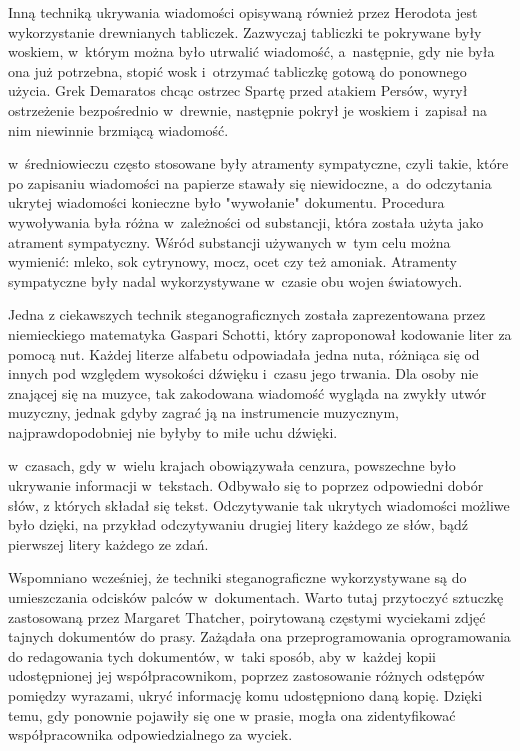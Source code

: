 \documentclass[a4paper, twoside, 12pt]{report}
\begin{document}
        Inną techniką ukrywania wiadomości opisywaną również przez Herodota
        jest wykorzystanie drewnianych tabliczek. Zazwyczaj tabliczki te pokrywane
        były woskiem, w~którym można było utrwalić wiadomość, a~następnie, gdy
        nie była ona już potrzebna, stopić wosk i~otrzymać tabliczkę gotową do
        ponownego użycia. Grek Demaratos chcąc ostrzec Spartę przed atakiem Persów,
        wyrył ostrzeżenie bezpośrednio w~drewnie, następnie pokrył je woskiem
        i~zapisał na nim niewinnie brzmiącą wiadomość.

        w~średniowieczu często stosowane były atramenty sympatyczne, czyli takie,
        które po zapisaniu wiadomości na papierze stawały się niewidoczne, a~do
        odczytania ukrytej wiadomości konieczne było "wywołanie" dokumentu. Procedura
        wywoływania była różna w~zależności od substancji, która została użyta jako
        atrament sympatyczny. Wśród substancji używanych w~tym celu można wymienić:
        mleko, sok cytrynowy, mocz, ocet czy też amoniak. Atramenty sympatyczne
        były nadal wykorzystywane w~czasie obu wojen światowych.

        Jedna z ciekawszych technik steganograficznych została zaprezentowana przez
        niemieckiego matematyka Gaspari Schotti\cite{NUTYSTEGANOGRAFIA},
        który zaproponował kodowanie liter za pomocą nut. Każdej literze alfabetu
        odpowiadała jedna nuta, różniąca się od innych pod względem wysokości
        dźwięku i~czasu jego trwania. Dla osoby nie znającej się na muzyce, tak zakodowana
        wiadomość wygląda na zwykły utwór muzyczny, jednak gdyby zagrać ją na instrumencie
        muzycznym, najprawdopodobniej nie byłyby to miłe uchu dźwięki.

        w~czasach, gdy w~wielu krajach obowiązywała cenzura, powszechne było ukrywanie
        informacji w~tekstach. Odbywało się to poprzez odpowiedni dobór słów,
        z których składał się tekst. Odczytywanie tak ukrytych wiadomości możliwe było
        dzięki, na przykład odczytywaniu drugiej litery każdego ze słów, bądź pierwszej
        litery każdego ze zdań.

        Wspomniano wcześniej, że techniki steganograficzne wykorzystywane są do umieszczania
        odcisków palców w~dokumentach. Warto tutaj przytoczyć sztuczkę zastosowaną
        przez Margaret Thatcher, poirytowaną częstymi wyciekami zdjęć tajnych dokumentów
        do prasy. Zażądała ona przeprogramowania oprogramowania do redagowania tych
        dokumentów, w~taki sposób, aby w~każdej kopii udostępnionej jej współpracownikom,
        poprzez zastosowanie różnych odstępów pomiędzy wyrazami, ukryć informację
        komu udostępniono daną kopię. Dzięki temu, gdy ponownie pojawiły się one w
        prasie, mogła ona zidentyfikować współpracownika odpowiedzialnego za wyciek.\cite{DIGITALWATERMARKING}
\end{document}
